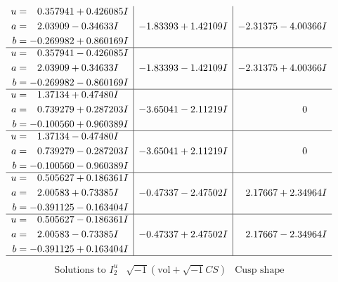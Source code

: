 \documentclass[1p]{elsarticle_modified}
\theoremstyle{definition}
\newcommand{\I}{\sqrt{-1}}
\begin{document}
$$\begin{array}{c|c|c}
\begin{aligned}
u &= \phantom{-}0.357941 + 0.426085 I \\
a &= \phantom{-}2.03909 - 0.34633 I \\
b &= -0.269982 + 0.860169 I\end{aligned}
 & -1.83393 + 1.42109 I & -2.31375 - 4.00366 I \\ \hline\begin{aligned}
u &= \phantom{-}0.357941 - 0.426085 I \\
a &= \phantom{-}2.03909 + 0.34633 I \\
b &= -0.269982 - 0.860169 I\end{aligned}
 & -1.83393 - 1.42109 I & -2.31375 + 4.00366 I \\ \hline\begin{aligned}
u &= \phantom{-}1.37134 + 0.47480 I \\
a &= \phantom{-}0.739279 + 0.287203 I \\
b &= -0.100560 + 0.960389 I\end{aligned}
 & -3.65041 - 2.11219 I & \phantom{-0.000000 } 0 \\ \hline\begin{aligned}
u &= \phantom{-}1.37134 - 0.47480 I \\
a &= \phantom{-}0.739279 - 0.287203 I \\
b &= -0.100560 - 0.960389 I\end{aligned}
 & -3.65041 + 2.11219 I & \phantom{-0.000000 } 0 \\ \hline\begin{aligned}
u &= \phantom{-}0.505627 + 0.186361 I \\
a &= \phantom{-}2.00583 + 0.73385 I \\
b &= -0.391125 - 0.163404 I\end{aligned}
 & -0.47337 - 2.47502 I & \phantom{-}2.17667 + 2.34964 I \\ \hline\begin{aligned}
u &= \phantom{-}0.505627 - 0.186361 I \\
a &= \phantom{-}2.00583 - 0.73385 I \\
b &= -0.391125 + 0.163404 I\end{aligned}
 & -0.47337 + 2.47502 I & \phantom{-}2.17667 - 2.34964 I\\
 \hline 
 \end{array}$$\newpage$$\begin{array}{c|c|c}  
\text{Solutions to }I^u_{2}& \I (\text{vol} + \sqrt{-1}CS) & \text{Cusp shape}\\
 \hline 
\begin{aligned}

\end{aligned}
\end{array}$$
\end{document}
